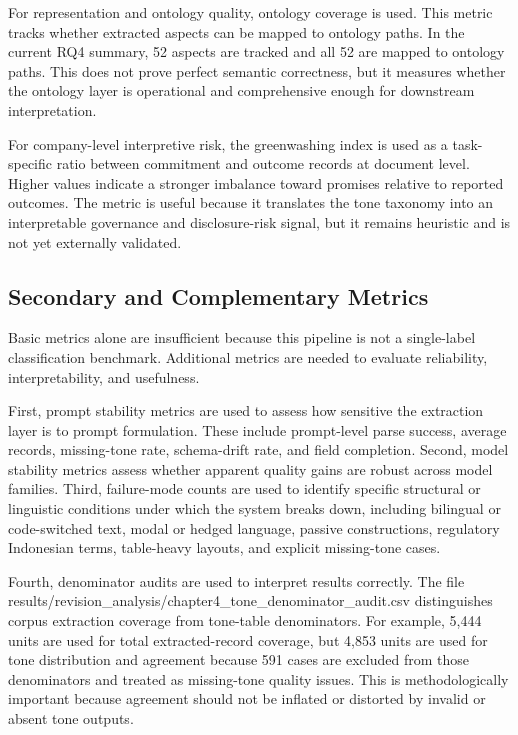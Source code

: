 For representation and ontology quality, ontology coverage is used. This metric tracks whether extracted aspects can be mapped to ontology paths. In the current RQ4 summary, 52 aspects are tracked and all 52 are mapped to ontology paths. This does not prove perfect semantic correctness, but it measures whether the ontology layer is operational and comprehensive enough for downstream interpretation.

For company-level interpretive risk, the greenwashing index is used as a task-specific ratio between commitment and outcome records at document level. Higher values indicate a stronger imbalance toward promises relative to reported outcomes. The metric is useful because it translates the tone taxonomy into an interpretable governance and disclosure-risk signal, but it remains heuristic and is not yet externally validated.

\subsection{Secondary and Complementary Metrics}

Basic metrics alone are insufficient because this pipeline is not a single-label classification benchmark. Additional metrics are needed to evaluate reliability, interpretability, and usefulness.

First, prompt stability metrics are used to assess how sensitive the extraction layer is to prompt formulation. These include prompt-level parse success, average records, missing-tone rate, schema-drift rate, and field completion. Second, model stability metrics assess whether apparent quality gains are robust across model families. Third, failure-mode counts are used to identify specific structural or linguistic conditions under which the system breaks down, including bilingual or code-switched text, modal or hedged language, passive constructions, regulatory Indonesian terms, table-heavy layouts, and explicit missing-tone cases.

Fourth, denominator audits are used to interpret results correctly. The file results/revision\_analysis/chapter4\_tone\_denominator\_audit.csv distinguishes corpus extraction coverage from tone-table denominators. For example, 5,444 units are used for total extracted-record coverage, but 4,853 units are used for tone distribution and agreement because 591 cases are excluded from those denominators and treated as missing-tone quality issues. This is methodologically important because agreement should not be inflated or distorted by invalid or absent tone outputs.

